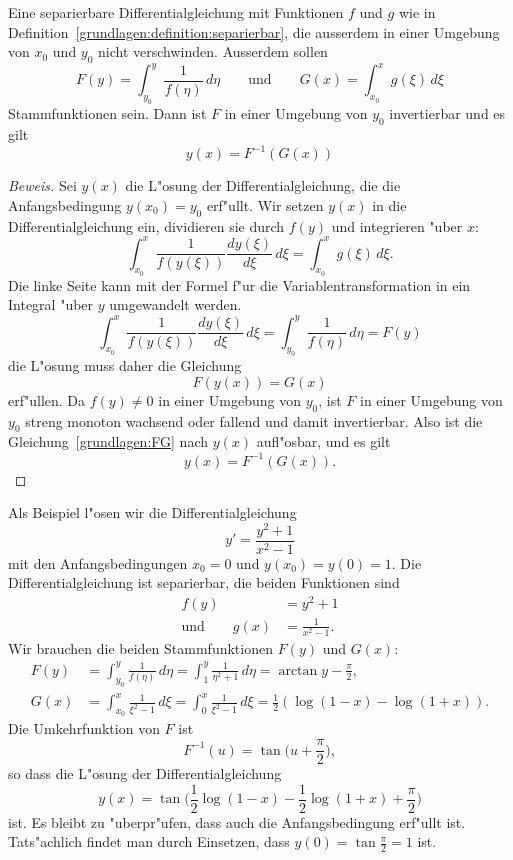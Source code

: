 \begin{satz}
%
Eine separierbare Differentialgleichung mit Funktionen $f$ und $g$ wie
in Definition~\ref{grundlagen:definition:separierbar},
die ausserdem in einer Umgebung von $x_0$ und $y_0$ nicht verschwinden.
Ausserdem sollen
\[
F(y)=\int_{y_0}^y \frac1{f(\eta)}\,d\eta
\qquad\text{und}\qquad
G(x)=\int_{x_0}^x g(\xi)\,d\xi
\]
Stammfunktionen sein.
Dann ist $F$ in einer Umgebung von $y_0$ invertierbar und es gilt
\[
y(x)=F^{-1}(G(x))
\]
\end{satz}

\begin{proof}[Beweis]
Sei $y(x)$ die L"osung der Differentialgleichung, die die Anfangsbedingung
$y(x_0)=y_0$ erf"ullt.
Wir setzen $y(x)$ in die Differentialgleichung ein,
dividieren sie durch $f(y)$ und integrieren "uber $x$:
\[
\int_{x_0}^x\frac1{f(y(\xi))}\frac{dy(\xi)}{d\xi}\,d\xi
=
\int_{x_0}^x g(\xi)\,d\xi.
\]
Die linke Seite kann mit der Formel f"ur die Variablentransformation in
ein Integral "uber $y$ umgewandelt werden.
\[
\int_{x_0}^x\frac1{f(y(\xi))}\frac{dy(\xi)}{d\xi}\,d\xi
=
\int_{y_0}^y \frac1{f(\eta)}\,d\eta=F(y)
\]
die L"osung muss daher die Gleichung
\begin{equation}
F(y(x))=G(x)
\label{grundlagen:FG}
\end{equation}
erf"ullen.
Da $f(y)\ne 0$ in einer Umgebung von $y_0$, ist $F$ in einer Umgebung von $y_0$
streng monoton wachsend oder fallend und damit invertierbar.
Also ist die Gleichung~\eqref{grundlagen:FG} nach $y(x)$ aufl"osbar, und
es gilt
\[
y(x)=F^{-1}(G(x)).
\]
\end{proof}

\begin{beispiel}
Als Beispiel l"osen wir die Differentialgleichung
\[
y'=\frac{y^2+1}{x^2-1}
\]
mit den Anfangsbedingungen $x_0=0$ und $y(x_0)=y(0)=1$.
Die Differentialgleichung ist separierbar, die beiden Funktionen sind
\begin{align*}
f(y)&=y^2+1
\\
\text{und}\qquad
g(x)&=\frac1{x^2-1}.
\end{align*}
Wir brauchen die beiden Stammfunktionen $F(y)$ und $G(x)$:
\begin{align*}
F(y)
&=
\int_{y_0}^y \frac1{f(\eta)}\,d\eta
=
\int_{1}^y \frac1{\eta^2+1}\,d\eta
=
\arctan y - \frac{\pi}2,
\\
G(x)
&=
\int_{x_0}^x\frac1{\xi^2-1}\,d\xi
=
\int_0^x \frac1{\xi^2-1}\,d\xi
=
\frac12(\log(1-x)-\log(1+x)).
\end{align*}
Die Umkehrfunktion von $F$ ist
\[
F^{-1}(u)=\tan\biggl(u+\frac{\pi}2\biggr),
\]
so dass die L"osung der Differentialgleichung
\[
y(x)=
\tan\biggl(\frac12\log(1-x)-\frac12\log(1+x)+\frac{\pi}2\biggr)
\]
ist.
Es bleibt zu "uberpr"ufen, dass auch die Anfangsbedingung erf"ullt
ist.
Tats"achlich findet man durch Einsetzen, dass $y(0)=\tan\frac{\pi}2=1$ ist.
\end{beispiel}

